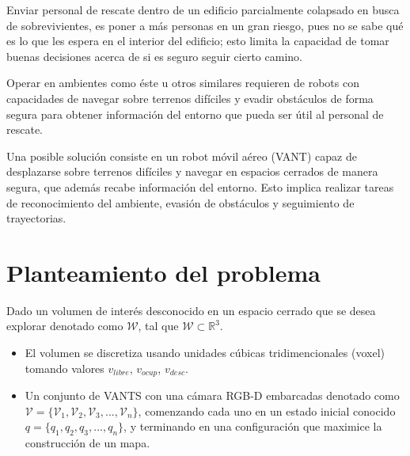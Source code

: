 Enviar personal de rescate dentro de un edificio parcialmente colapsado en busca de sobrevivientes, es poner a más personas en un gran riesgo, pues no se sabe qué es lo que les espera en el interior del edificio; esto limita la capacidad de tomar buenas decisiones acerca de si es seguro seguir cierto camino.

Operar en ambientes como éste u otros similares requieren de robots con capacidades de navegar sobre terrenos difíciles y evadir obstáculos de forma segura para obtener información del entorno que pueda ser útil al personal de rescate.

Una posible solución consiste en un robot móvil aéreo (VANT) capaz de desplazarse sobre terrenos difíciles y navegar en espacios cerrados de manera segura, que además recabe información del entorno. Esto implica realizar tareas de reconocimiento del ambiente, evasión de obstáculos y seguimiento de trayectorias.

\section{Planteamiento del problema} 

Dado un volumen de interés desconocido en un espacio cerrado que se desea explorar denotado como $\mathcal{W}$, tal que $\mathcal{W} \subset \mathbb{R}^{3}$.
\begin{itemize}\setlength{\itemsep}{-1mm}
  \item El volumen se discretiza usando unidades cúbicas tridimencionales (voxel) tomando valores $v_{libre}$, $v_{ocup}$, $v_{desc}$.
  \item Un conjunto de VANTS con una cámara RGB-D embarcadas denotado como $\mathcal{V} = \{\mathcal{V}_{1},\mathcal{V}_{2},\mathcal{V}_{3},...,\mathcal{V}_{n}\}$, comenzando cada uno en un estado inicial conocido $q = \{q_{1},q_{2},q_{3},...,q_{n}\}$, y terminando en una configuración que maximice la construcción de un mapa.
\end{itemize}

